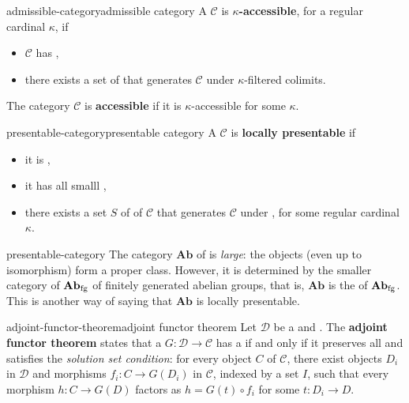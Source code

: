 \begin{topic}{admissible-category}{admissible category}
    A  $\mathcal{C}$ is \textbf{$\kappa$-accessible}, for a regular cardinal $\kappa$, if
    \begin{itemize}
        \item $\mathcal{C}$ has ,
        \item there exists a set of  that generates $\mathcal{C}$ under $\kappa$-filtered colimits.
    \end{itemize}
    The category $\mathcal{C}$ is \textbf{accessible} if it is $\kappa$-accessible for some $\kappa$.
\end{topic}

\begin{topic}{presentable-category}{presentable category}
    A  $\mathcal{C}$ is \textbf{locally presentable} if
    \begin{itemize}
        \item it is ,
        \item it has all smalll ,
        \item there exists a set $S$ of  of $\mathcal{C}$ that generates $\mathcal{C}$ under , for some regular cardinal $\kappa$.
    \end{itemize}
\end{topic}

\begin{example}{presentable-category}
    The category $\textbf{Ab}$ of  is \textit{large}: the objects (even up to isomorphism) form a proper class. However, it is determined by the smaller category of $\textbf{Ab}_\textup{fg}$ of finitely generated abelian groups, that is, $\textbf{Ab}$ is the  of $\textbf{Ab}_\textup{fg}$. This is another way of saying that $\textbf{Ab}$ is locally presentable.
\end{example}

\begin{topic}{adjoint-functor-theorem}{adjoint functor theorem}
    Let $\mathcal{D}$ be a  and  . The \textbf{adjoint functor theorem} states that a  $G \colon \mathcal{D} \to \mathcal{C}$ has a  if and only if it preserves all  and satisfies the \textit{solution set condition}:
    for every object $C$ of $\mathcal{C}$, there exist objects $D_i$ in $\mathcal{D}$ and morphisms $f_i \colon C \to G(D_i)$ in $\mathcal{C}$, indexed by a set $I$, such that every morphism $h \colon C \to G(D)$ factors as $h = G(t) \circ f_i$ for some $t \colon D_i \to D$.
\end{topic}

